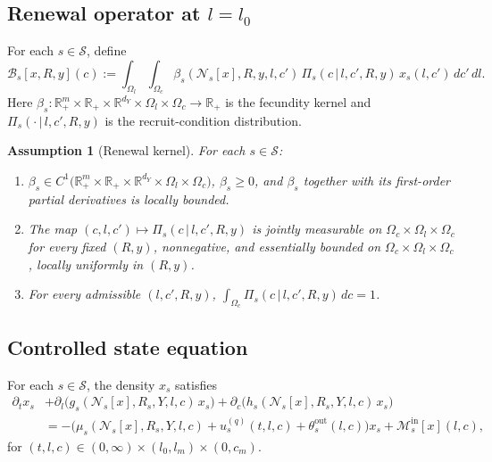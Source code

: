 \documentclass[pdflatex,sn-mathphys-num]{sn-jnl}%
\newtheorem{assumption}[theorem]{Assumption}
\begin{document}
\subsection{Renewal operator at \texorpdfstring{\(l=l_0\)}{l=l_0}}
For each \(s\in\mathcal S\), define
\begin{equation}\label{eq:model_birth_operator}
\mathcal B_s[x,R,y](c)
:=
\int_{\Omega_l}\int_{\Omega_c}
\beta_s(\mathcal N_s[x],R,y,l,c')\,
\Pi_s(c\,|\,l,c',R,y)\,
x_s(l,c')\,dc'\,dl.
\end{equation}
Here
\(\beta_s:\mathbb R_+^m\times\mathbb R_+\times\mathbb R^{d_Y}\times\Omega_l\times\Omega_c
\to\mathbb R_+\)
is the fecundity kernel and
\(\Pi_s(\cdot\,|\,l,c',R,y)\)
is the recruit-condition distribution.
\begin{assumption}[Renewal kernel]\label{ass:model_birth_operator}
For each \(s\in\mathcal S\):
\begin{enumerate}[label=\textup{(B\arabic*)}]
\item
\(\beta_s\in
C^1\big(\mathbb R_+^m\times\mathbb R_+\times\mathbb R^{d_Y}\times\Omega_l\times\Omega_c\big)\),
\(\beta_s\ge 0\),
and \(\beta_s\) together with its first-order partial derivatives is locally bounded.
\item
The map
\((c,l,c')\longmapsto \Pi_s(c\,|\,l,c',R,y)\)
is jointly measurable on
\(\Omega_c\times\Omega_l\times\Omega_c\) for every fixed \((R,y)\),
nonnegative, and essentially bounded on
\(\Omega_c\times\Omega_l\times\Omega_c\), locally uniformly in \((R,y)\).
\item
For every admissible \((l,c',R,y)\),
\(\int_{\Omega_c}\Pi_s(c\,|\,l,c',R,y)\,dc=1\).
\end{enumerate}
\end{assumption}

\subsection{Controlled state equation}
For each \(s\in\mathcal S\), the density \(x_s\) satisfies
\begin{equation}\label{eq:model_state_equation}
\begin{aligned}
\partial_t x_s
&+\partial_l\!\big(g_s(\mathcal N_s[x],R_s,Y,l,c)\,x_s\big)
+\partial_c\!\big(h_s(\mathcal N_s[x],R_s,Y,l,c)\,x_s\big)
\\
&=
-\big(\mu_s(\mathcal N_s[x],R_s,Y,l,c)
+u_s^{(q)}(t,l,c)
+\theta_s^{\mathrm{out}}(l,c)\big)x_s
+\mathcal M_s^{\mathrm{in}}[x](l,c),
\end{aligned}
\end{equation}
for \((t,l,c)\in (0,\infty)\times(l_0,l_m)\times(0,c_m)\).
\end{document}
